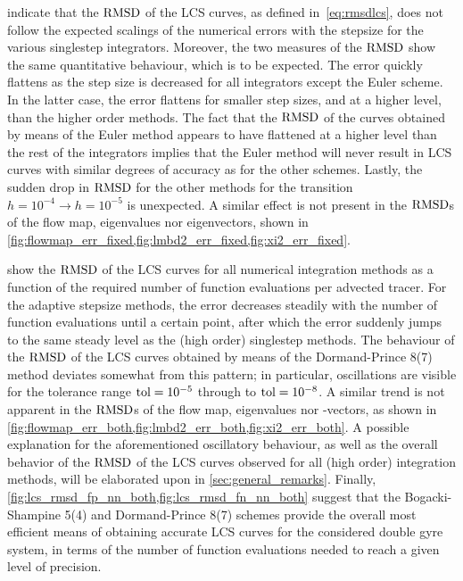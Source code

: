  indicate that the
$\operatorname{RMSD}$ of the LCS curves, as defined in~\cref{eq:rmsdlcs}, does not follow the
expected scalings of the numerical errors with the stepsize for the various
singlestep integrators. Moreover, the two measures of the $\operatorname{RMSD}$ show the same
quantitative behaviour, which is to be expected. The error quickly flattens as
the step size is decreased for all integrators except the Euler scheme. In the
latter case, the error flattens for smaller step sizes, and at a higher level,
than the higher order methods. The fact that the $\operatorname{RMSD}$  of the curves obtained
by means of the Euler method appears to have flattened  at a higher level than
the rest of the integrators implies that the Euler method will never result in
LCS curves with similar degrees of accuracy as for the other schemes. Lastly,
the sudden drop in $\operatorname{RMSD}$ for the other methods for the transition
$h=10^{-4}\rightarrow{h=10^{-5}}$ is unexpected. A similar effect is not present
in the $\operatorname{RMSD}$s of the flow map, eigenvalues nor eigenvectors, shown in
\cref{fig:flowmap_err_fixed,fig:lmbd2_err_fixed,fig:xi2_err_fixed}.

%
%
 show the $\operatorname{RMSD}$ of the
LCS curves for all numerical integration methods as a function of the required
number of function evaluations per advected tracer. For the adaptive stepsize
methods, the error decreases steadily with the number of function evaluations
until a certain point, after which the error suddenly jumps to the same steady
level as the (high order) singlestep methods. The behaviour of the $\operatorname{RMSD}$ of
the LCS curves obtained by means of the Dormand-Prince 8(7) method deviates
somewhat from this pattern; in particular, oscillations are visible for the
tolerance range $\textnormal{tol}=10^{-5}$ through to
$\textnormal{tol}=10^{-8}$. A similar trend is not apparent in the $\operatorname{RMSD}$s of
the flow map, eigenvalues nor -vectors, as shown in
\cref{fig:flowmap_err_both,fig:lmbd2_err_both,fig:xi2_err_both}. A possible
explanation for the aforementioned oscillatory behaviour, as well as the
overall behavior of the $\operatorname{RMSD}$ of the LCS curves observed for all (high
order) integration methods, will be elaborated upon in
\cref{sec:general_remarks}. Finally,
\cref{fig:lcs_rmsd_fp_nn_both,fig:lcs_rmsd_fn_nn_both} suggest that the
Bogacki-Shampine 5(4) and Dormand-Prince 8(7) schemes provide the overall most
efficient means of obtaining accurate LCS curves for the considered double gyre
system, in terms of the number of function evaluations needed to reach a given
level of precision.


